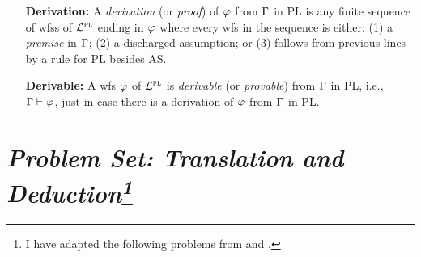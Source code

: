 \documentclass[a4paper, 11pt]{article} %
\begin{document}
\begin{enumerate}
  \item[\bf Derivation:] A \textit{derivation} (or \textit{proof}) of $\varphi$ from $\Gamma$ in PL is any finite sequence of wfss of $\mathcal{L}^{\textsc{pl}}$ ending in $\varphi$ where every wfs in the sequence is either: (1) a \textit{premise} in $\Gamma$; (2) a discharged assumption; or (3) follows from previous lines by a rule for PL besides AS. 
  \item[\bf Derivable:] A wfs $\varphi$ of $\mathcal{L}^{\textsc{pl}}$ is \textit{derivable} (or \textit{provable}) from $\Gamma$ in PL, i.e., $\Gamma \vdash \varphi$, just in case there is a derivation of $\varphi$ from $\Gamma$ in PL. 
\end{enumerate}



\section*{\it Problem Set: Translation and Deduction\footnote{I have adapted the following problems from \citet{Goldfarb2003} and \citet{Laboreo2005}.}}
\end{document}
